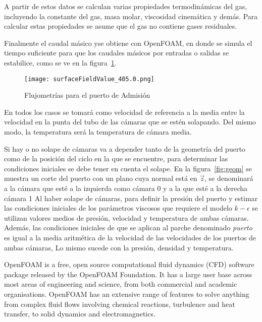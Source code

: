A partir de estos datos se calculan varias propiedades termodinámicas del gas,
incluyendo la constante del gas, masa molar, viscosidad cinemática y demás.
%
Para calcular estas propiedades se asume que el gas no contiene gases
residuales.

Finalmente el caudal másico yse obtiene con OpenFOAM, en donde se simula el
tiempo suficiente para que los caudales másicos por entradas o salidas se
estabilice, como se ve en la figura~\ref{fig:caudalMasico}.

\begin{figure}
    \centering
    \texttt{[image: surfaceFieldValue\_405.0.png]}
    \caption{Flujometrías para el puerto de Admisión}\label{fig:caudalMasico}
\end{figure}
En todos los casos se tomará como velocidad de referencia a la media entre la
velocidad en la punta del tubo de las cámaras que se estén solapando.
%
Del mismo modo, la temperatura será la temperatura de cámara media.

Si hay o no solape de cámaras va a depender tanto de la geometría del puerto
como de la posición del ciclo en la que se encuentre, para determinar las
condiciones iniciales se debe tener en cuenta el solape.
%
En la figura~\ref{fig:geom} se muestra un corte del puerto con un plano cuya
normal está en $\vec{z}$, se denominará a la cámara que esté a la izquierda
como cámara 0 y a la que esté a la derecha cámara 1
%
Al haber solape de cámaras, para definir la presión del puerto y estimar las
condiciones iniciales de los parámetros viscosos que requiere el modelo
$k-\epsilon$ se utilizan valores medios de presión, velocidad y temperatura de
ambas cámaras.
%
Además, las condiciones iniciales de que se aplican al parche denominado
\emph{puerto} es igual a la media aritmética de la velocidad de las velocidades
de los puertos de ambas cámaras, Lo mismo sucede con la presión, densidad y
temperatura.



OpenFOAM is a free, open source computational fluid dynamics (CFD) software
package released by the OpenFOAM Foundation.
%
It has a large user base across most areas of engineering and science, from both
commercial and academic organisations.
%
OpenFOAM has an extensive range of features to solve anything from complex fluid
flows involving chemical reactions, turbulence and heat transfer, to solid
dynamics and electromagnetics.
